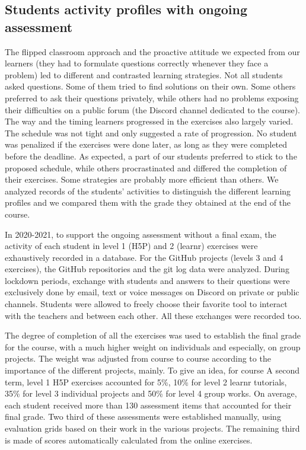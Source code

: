 \documentclass{aims}
\theoremstyle{definition}
\begin{document}
\hypertarget{students-activity-profiles-with-ongoing-assessment-1}{%
\subsection{Students activity profiles with ongoing
assessment}\label{students-activity-profiles-with-ongoing-assessment-1}}

The flipped classroom approach and the proactive attitude we expected
from our learners (they had to formulate questions correctly whenever
they face a problem) led to different and contrasted learning
strategies. Not all students asked questions. Some of them tried to find
solutions on their own. Some others preferred to ask their questions
privately, while others had no problems exposing their difficulties on a
public forum (the Discord channel dedicated to the course). The way and
the timing learners progressed in the exercises also largely varied. The
schedule was not tight and only suggested a rate of progression. No
student was penalized if the exercises were done later, as long as they
were completed before the deadline. As expected, a part of our students
preferred to stick to the proposed schedule, while others procrastinated
and differed the completion of their exercises. Some strategies are
probably more efficient than others. We analyzed records of the
students' activities to distinguish the different learning profiles and
we compared them with the grade they obtained at the end of the course.

In 2020-2021, to support the ongoing assessment without a final exam,
the activity of each student in level 1 (H5P) and 2 (learnr) exercises
were exhaustively recorded in a database. For the GitHub projects
(levels 3 and 4 exercises), the GitHub repositories and the git log data
were analyzed. During lockdown periods, exchange with students and
answers to their questions were exclusively done by email, text or voice
messages on Discord on private or public channels. Students were allowed
to freely choose their favorite tool to interact with the teachers and
between each other. All these exchanges were recorded too.

The degree of completion of all the exercises was used to establish the
final grade for the course, with a much higher weight on individuals and
especially, on group projects. The weight was adjusted from course to
course according to the importance of the different projects, mainly. To
give an idea, for course A second term, level 1 H5P exercises accounted
for 5\%, 10\% for level 2 learnr tutorials, 35\% for level 3 individual
projects and 50\% for level 4 group works. On average, each student
received more than 130 assessment items that accounted for their final
grade. Two third of these assessments were established manually, using
evaluation grids based on their work in the various projects. The
remaining third is made of scores automatically calculated from the
online exercises.
\end{document}
